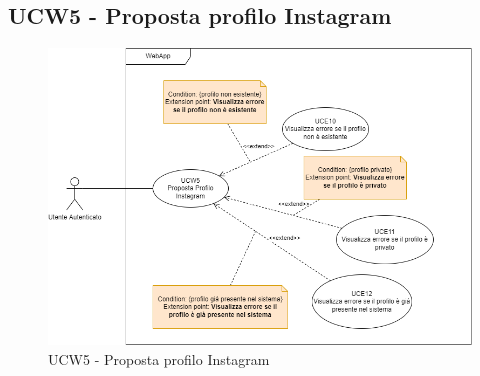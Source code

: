 \subsection{UCW5 - Proposta profilo Instagram}
\begin{figure}[!h]
\centering
\includegraphics[scale=0.5]{UC_images/UCW5.png}
\caption{UCW5 - Proposta profilo Instagram}
\end{figure}
